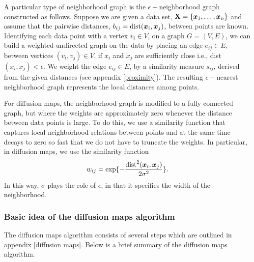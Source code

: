 A particular type of neighborhood graph is the $\epsilon-$neighborhood graph constructed as follows. Suppose we are given a data set, $\textbf{X} =  \{\boldsymbol{x}_{1}, \ldots, \boldsymbol{x}_{n} \}$ and assume that the pairwise distances, $b_{ij} = \text{dist}(\boldsymbol{x}_{i}, \boldsymbol{x}_{j})$, between points are known. Identifying each data point with a vertex $v_{i} \in V$, on a graph $G = (V, E)$, we can build a weighted  undirected graph on the data by placing an edge $e_{ij} \in E$, between vertices $(v_i, v_j) \in V$, if $x_i$ and $x_j$ are sufficiently close i.e., dist$(x_i, x_j) < \epsilon$. We weight the edge $e_{ij} \in E$, by a similarity measure $s_{ij}$, derived from the given distances (see appendix \ref{proximity}). The resulting $\epsilon-$nearest neighborhood graph represents the local distances among points.


For diffusion maps, the neighborhood graph is modified to a fully connected graph, but where the weights are approximately zero whenever the distance between data points is large.
To do this, we use a similarity function that captures local neighborhood relations between points and at the same time decays to zero so fast that we do not have to truncate the weights. In particular, in diffusion maps, we use the similarity function 
$$w_{ij} = \exp \{- \frac{\text{dist}^{2}(\boldsymbol{x}_i, \boldsymbol{x}_j)}{2 \sigma^2} \}.$$ 
In this way, $\sigma$ plays the role of $\epsilon$, in that it specifies the width of the neighborhood.

\subsubsection{Basic idea of the diffusion maps algorithm}
The diffusion maps algorithm consists of several steps which are outlined in appendix \ref{diffusion maps}. Below is a brief summary of the diffusion maps algorithm.

